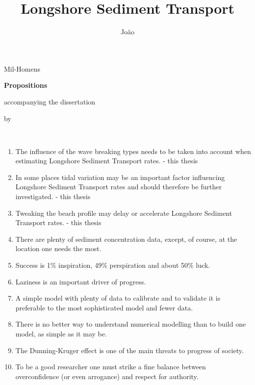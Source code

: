 \documentclass{dissertation}
\begin{document}
\title[Bulk Formulas and Process Based Models]{Longshore Sediment Transport}
\author{João}{Mil-Homens}

\begin{center}

{\Large\titlefont\bfseries Propositions}

\bigskip

accompanying the dissertation

\bigskip

{\makeatletter
\titlestyle\bfseries\large\@title
\makeatother}

{\makeatletter
\ifx\@subtitle\undefined\else
    \titlefont\titleshape\@subtitle
\fi
\makeatother}

\bigskip

by

\bigskip

\makeatletter
{\large\titlefont\bfseries\@firstname\ {\titleshape\@lastname}}
\makeatother

\end{center}

\bigskip
\bigskip

\begin{enumerate}

\item The influence of the wave breaking types needs to be taken into account when estimating Longshore Sediment Transport rates. - this thesis
\item In some places tidal variation may be an important factor influencing Longshore Sediment Transport  rates and should  therefore be further investigated. - this thesis
\item Tweaking the beach profile may delay or accelerate Longshore Sediment Transport rates. - this thesis
\item There are plenty of sediment concentration data, except, of course, at the location one needs the most.
\item Success is 1\% inspiration, 49\% perspiration and about 50\% luck.

\item Laziness is an important driver of progress.
\item A simple model with plenty of data to calibrate and to validate it is preferable to the most sophisticated model and fewer data.

\item There is no better way to understand numerical modelling than to build one model, as simple as it may be.
\item The Dunning-Kruger effect is one of the main threats to progress of society.
\item To be a good researcher one must strike a fine balance between overconfidence (or even arrogance) and respect for authority.
\end{enumerate}
\end{document}
